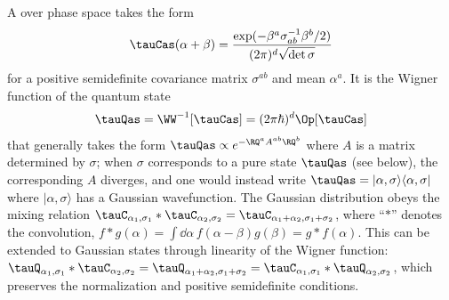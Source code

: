 \documentclass{article}
\numberwithin{equation}{section}
\begin{document}
A  over phase space takes the form
\begin{align}\label{eq:gaussian-wigner}
	\tauCas(\alpha+\beta) = \frac{\exp(-\beta^a\sigma^{-1}_{ab}\beta^b/2)}{(2\pi)^d\sqrt{\det\sigma}} 
\end{align}
for a positive semidefinite covariance matrix $\sigma^{ab}$ and mean $\alpha^a$. It is the Wigner function of the quantum state
\begin{align}\label{eq:gaussian-state}
	\tauQas = \WW^{-1}[\tauCas]= (2\pi\hbar)^{d}\Op[\tauCas] 
\end{align}
that generally takes the form $\tauQas \propto e^{-\RQ^a A^{ab} \RQ^b}$ where $A$ is a matrix determined by $\sigma$; when $\sigma$ corresponds to a pure state $\tauQas$ (see below), the corresponding $A$ diverges, and one would instead write $\tauQas=|\alpha,\sigma\rangle \langle \alpha,\sigma|$ where $|\alpha,\sigma\rangle $ has a Gaussian wavefunction.
The Gaussian distribution obeys the mixing relation $\tauC_{\alpha_1,\sigma_1}\ast\tauC_{\alpha_2,\sigma_2} = \tauC_{\alpha_1+\alpha_2,\sigma_1+\sigma_2}$, where ``$\ast$'' denotes the convolution, $f\ast g(\alpha) = \int\!\dd \alpha\, f(\alpha-\beta)g(\beta) = g\ast f(\alpha)$.  This can be extended to Gaussian states through linearity of the Wigner function:  $\tauQ_{\alpha_1,\sigma_1}\ast\tauC_{\alpha_2,\sigma_2} = \tauQ_{\alpha_1+\alpha_2,\sigma_1+\sigma_2} = \tauC_{\alpha_1,\sigma_1}\ast\tauQ_{\alpha_2,\sigma_2}$, which preserves the normalization and positive semidefinite conditions.
\end{document}
